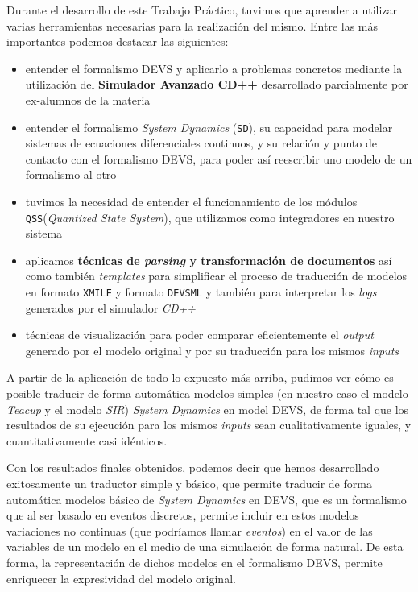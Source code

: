 Durante el desarrollo de este Trabajo Práctico, tuvimos que aprender a utilizar varias herramientas necesarias para la realización del mismo. Entre las más importantes podemos destacar las siguientes:
\begin{itemize}
\item entender el formalismo DEVS y aplicarlo a problemas concretos mediante la utilización del \textbf{Simulador Avanzado CD++} desarrollado parcialmente por ex-alumnos de la materia
\item entender el formalismo \textit{System Dynamics} (\texttt{SD}), su capacidad para modelar sistemas de ecuaciones diferenciales continuos, y su relación y punto de contacto con el formalismo DEVS, para poder así reescribir uno modelo de un formalismo al otro
\item tuvimos la necesidad de entender el funcionamiento de los módulos \texttt{QSS}(\textit{Quantized State System}), que utilizamos como integradores en nuestro sistema
\item aplicamos \textbf{técnicas de \textit{parsing} y transformación de documentos} así como también \textit{templates} para simplificar el proceso de traducción de modelos en formato \texttt{XMILE} y formato \texttt{DEVSML} y también para interpretar los \textit{logs} generados por el simulador \textit{CD++}
\item técnicas de visualización para poder comparar eficientemente el \textit{output} generado por el modelo original y por su traducción para los mismos \textit{inputs}
\end{itemize}

A partir de la aplicación de todo lo expuesto más arriba, pudimos ver cómo es posible traducir de forma automática modelos simples (en nuestro caso el modelo \textit{Teacup} y el modelo \textit{SIR}) \textit{System Dynamics} en model DEVS, de forma tal que los resultados de su ejecución para los mismos \textit{inputs} sean cualitativamente iguales, y cuantitativamente casi idénticos.

Con los resultados finales obtenidos, podemos decir que hemos desarrollado exitosamente un traductor simple y básico, que permite traducir de forma automática modelos básico de \textit{System Dynamics} en DEVS, que es un formalismo que al ser basado en eventos discretos, permite incluir en estos modelos variaciones no continuas (que podríamos llamar \textit{eventos}) en el valor de las variables de un modelo en el medio de una simulación de forma natural. De esta forma, la representación de dichos modelos en el formalismo DEVS, permite enriquecer la expresividad del modelo original.